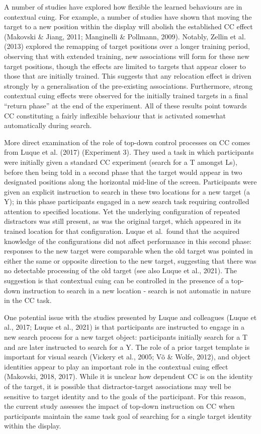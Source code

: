 \documentclass[
  man,floatsintext]{apa7}
\begin{document}
A number of studies have explored how flexible the learned behaviours are in contextual cuing. For example, a number of studies have shown that moving the target to a new position within the display will abolish the established CC effect (Makovski \& Jiang, 2011; Manginelli \& Pollmann, 2009). Notably, Zellin et al. (2013) explored the remapping of target positions over a longer training period, observing that with extended training, new associations will form for these new target positions, though the effects are limited to targets that appear closer to those that are initially trained. This suggests that any relocation effect is driven strongly by a generalisation of the pre-existing associations. Furthermore, strong contextual cuing effects were observed for the initially trained targets in a final ``return phase'' at the end of the experiment. All of these results point towards CC constituting a fairly inflexible behaviour that is activated somewhat automatically during search.

More direct examination of the role of top-down control processes on CC comes from Luque et al. (2017) (Experiment 3). They used a task in which participants were initially given a standard CC experiment (search for a T amongst Ls), before then being told in a second phase that the target would appear in two designated positions along the horizontal mid-line of the screen. Participants were given an explicit instruction to search in these two locations for a new target (a Y); in this phase participants engaged in a new search task requiring controlled attention to specified locations. Yet the underlying configuration of repeated distractors was still present, as was the original target, which appeared in its trained location for that configuration. Luque et al.~found that the acquired knowledge of the configurations did not affect performance in this second phase: responses to the new target were comparable when the old target was pointed in either the same or opposite direction to the new target, suggesting that there was no detectable processing of the old target (see also Luque et al., 2021). The suggestion is that contextual cuing can be controlled in the presence of a top-down instruction to search in a new location - search is not automatic in nature in the CC task.

One potential issue with the studies presented by Luque and colleagues (Luque et al., 2017; Luque et al., 2021) is that participants are instructed to engage in a new search process for a new target object: participants initially search for a T and are later instructed to search for a Y. The role of a prior target template is important for visual search (Vickery et al., 2005; Võ \& Wolfe, 2012), and object identities appear to play an important role in the contextual cuing effect (Makovski, 2018, 2017). While it is unclear how dependent CC is on the identity of the target, it is possible that distractor-target associations may well be sensitive to target identity and to the goals of the participant. For this reason, the current study assesses the impact of top-down instruction on CC when participants maintain the same task goal of searching for a single target identity within the display.
\end{document}
